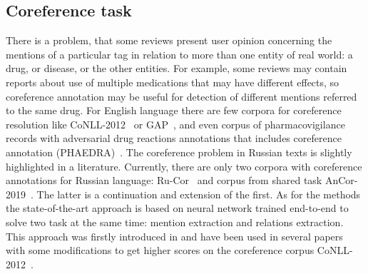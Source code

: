 \documentclass[a4paper,fleqn,longmktitle]{cas-dc}
\newcommand{\Fp}{F_1^\text{partial}}
\newcommand{\Fe}{F_1^\text{exact}}
\begin{document}
\subsection{Coreference task}
There is a problem, that some reviews present user opinion concerning the mentions of a particular tag in relation to more than one entity of real world: a drug, or disease, or the other entities. For example, some reviews may contain reports about use of multiple medications that may have different effects, so coreference annotation may be useful for detection of different mentions referred to the same drug. For English language there are few corpora for coreference resolution like CoNLL-2012~\cite{pradhan2012conll} or GAP~\cite{webster2018gap}, and even corpus of pharmacovigilance records with adversarial drug reactions annotations that includes coreference annotation (PHAEDRA)~\cite{thompson2018annotation}. The coreference problem  in Russian texts is slightly highlighted in a literature. Currently, there are only two corpora with coreference annotations for Russian language: Ru-Cor~\cite{azerkovich2014evaluating6887693} and corpus from shared task AnCor-2019~\cite{Ju2014RUEVAL2019EA}. The latter is a continuation and extension of the first. As for the methods the state-of-the-art approach is based on neural network trained end-to-end to solve two task at the same time: mention extraction and relations extraction. This approach was firstly introduced in \cite{lee2017end} and have been used in several papers\cite{lee2018higher, joshi2019bert, xu2020revealing, joshi2020spanbert, toshniwal2020learning} with some modifications to get higher scores on the coreference corpus CoNLL-2012~\cite{pradhan2012conll}.

%
\end{document}

